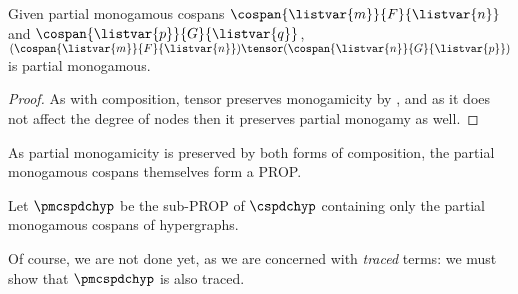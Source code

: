 \begin{lemma}
    Given partial monogamous cospans \(\cospan{\listvar{m}}{F}{\listvar{n}}\)
    and \(\cospan{\listvar{p}}{G}{\listvar{q}}\), \(
        (\cospan{\listvar{m}}{F}{\listvar{n}})
        \tensor
        (\cospan{\listvar{n}}{G}{\listvar{p}})
    \) is partial monogamous.
\end{lemma}
\begin{proof}
    As with composition, tensor preserves monogamicity by
    \cite[Lem. 17]{bonchi2022stringa}, and as it does not affect the degree of
    nodes then it preserves partial monogamy as well.
\end{proof}

As partial monogamicity is preserved by both forms of composition, the
partial monogamous cospans themselves form a PROP.

\begin{definition}
    Let \(\pmcspdchyp\) be the sub-PROP of \(\cspdchyp\) containing only the
    partial monogamous cospans of hypergraphs.
\end{definition}

Of course, we are not done yet, as we are concerned with \emph{traced} terms:
we must show that \(\pmcspdchyp\) is also traced.

